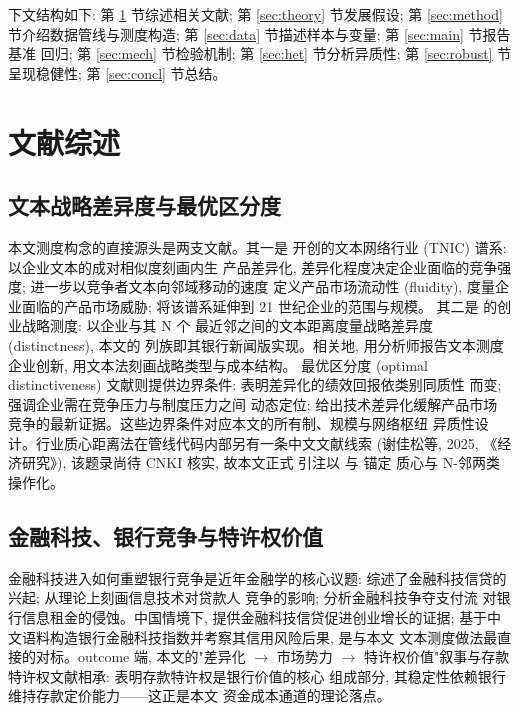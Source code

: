 下文结构如下: 第 \ref{sec:lit} 节综述相关文献; 第 \ref{sec:theory}
节发展假设; 第 \ref{sec:method} 节介绍数据管线与测度构造;
第 \ref{sec:data} 节描述样本与变量; 第 \ref{sec:main} 节报告基准
回归; 第 \ref{sec:mech} 节检验机制; 第 \ref{sec:het} 节分析异质性;
第 \ref{sec:robust} 节呈现稳健性; 第 \ref{sec:concl} 节总结。

\section{文献综述}\label{sec:lit}

\subsection{文本战略差异度与最优区分度}
本文测度构念的直接源头是两支文献。其一是 \textcite{hoberg2016tnic}
开创的文本网络行业 (TNIC) 谱系: 以企业文本的成对相似度刻画内生
产品差异化, 差异化程度决定企业面临的竞争强度;
\textcite{hoberg2014fluidity} 进一步以竞争者文本向邻域移动的速度
定义产品市场流动性 (fluidity), 度量企业面临的产品市场威胁;
\textcite{hoberg2025scope} 将该谱系延伸到 21 世纪企业的范围与规模。
其二是 \textcite{guzman2023strategy} 的创业战略测度: 以企业与其 N 个
最近邻之间的文本距离度量战略差异度 (distinctness), 本文的
 列族即其银行新闻版实现。相关地,
\textcite{bellstam2021innovation} 用分析师报告文本测度企业创新,
\textcite{banker2024strategy} 用文本法刻画战略类型与成本结构。
最优区分度 (optimal distinctiveness) 文献则提供边界条件:
\textcite{haans2019distinctiveness} 表明差异化的绩效回报依类别同质性
而变; \textcite{su2024optimal} 强调企业需在竞争压力与制度压力之间
动态定位; \textcite{arts2025technology} 给出技术差异化缓解产品市场
竞争的最新证据。这些边界条件对应本文的所有制、规模与网络枢纽
异质性设计。行业质心距离法在管线代码内部另有一条中文文献线索
(谢佳松等, 2025, 《经济研究》), 该题录尚待 CNKI 核实, 故本文正式
引注以 \textcite{hoberg2016tnic} 与 \textcite{guzman2023strategy} 锚定
质心与 N-邻两类操作化。

\subsection{金融科技、银行竞争与特许权价值}
金融科技进入如何重塑银行竞争是近年金融学的核心议题:
\textcite{berg2022fintechlending} 综述了金融科技信贷的兴起;
\textcite{vives2025lendercompetition} 从理论上刻画信息技术对贷款人
竞争的影响; \textcite{parlour2022payments} 分析金融科技争夺支付流
对银行信息租金的侵蚀。中国情境下, \textcite{hau2024fintechcredit}
提供金融科技信贷促进创业增长的证据; \textcite{cheng2020bankfintech}
基于中文语料构造银行金融科技指数并考察其信用风险后果, 是与本文
文本测度做法最直接的对标。outcome 端, 本文的"差异化 $\to$ 市场势力
$\to$ 特许权价值"叙事与存款特许权文献相承:
\textcite{drechsler2026franchise} 表明存款特许权是银行价值的核心
组成部分, 其稳定性依赖银行维持存款定价能力——这正是本文
资金成本通道的理论落点。

